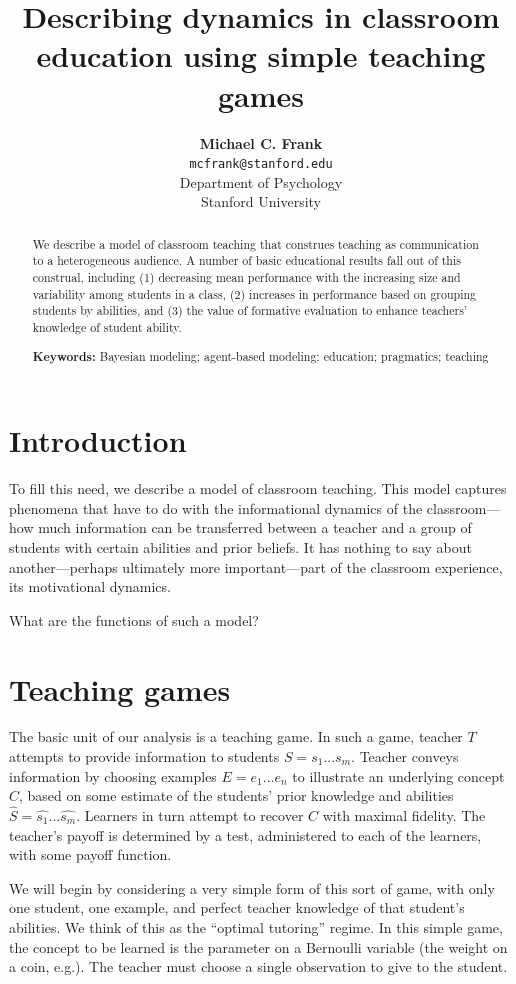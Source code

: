 \documentclass[10pt,letterpaper]{article}
\title{Describing dynamics in classroom education using simple teaching games}
\author{{\large \bf Michael C. Frank} \\
  \texttt{mcfrank@stanford.edu} \\
  Department of Psychology\\
  Stanford University}
\begin{document}
\maketitle


\begin{abstract}
We describe a model of classroom teaching that construes teaching as communication to a heterogeneous audience. A number of basic educational results fall out of this construal, including (1) decreasing mean performance with the increasing size and variability among students in a class, (2) increases in performance based on grouping students by abilities, and (3) the value of formative evaluation to enhance teachers' knowledge of student ability.

\textbf{Keywords:} 
Bayesian modeling; agent-based modeling; education; pragmatics; teaching
\end{abstract}

\section{Introduction}

To fill this need, we describe a model of classroom teaching. This model captures phenomena that have to do with the informational dynamics of the classroom---how much information can be transferred between a teacher and a group of students with certain abilities and prior beliefs. It has nothing to say about another---perhaps ultimately more important---part of the classroom experience, its motivational dynamics.  

What are the functions of such a model? 

\section{Teaching games}

The basic unit of our analysis is a teaching game. In such a game, teacher $T$ attempts to provide information to students $S = {s_1 ... s_m}$. Teacher conveys information by choosing examples $E = {e_1 ... e_n}$ to illustrate an underlying concept $C$, based on some estimate of the students' prior knowledge and abilities $\hat{S} = {\hat{s_1} ... \hat{s_m}}$. Learners in turn attempt to recover $C$ with maximal fidelity. The teacher's payoff is determined by a test, administered to each of the learners, with some payoff function. 

We will begin by considering a very simple form of this sort of game, with only one student, one example, and perfect teacher knowledge of that student's abilities. We think of this as the ``optimal tutoring'' regime. In this simple game, the concept to be learned is the parameter on a Bernoulli variable (the weight on a coin, e.g.). The teacher must choose a single observation to give to the student. 
\end{document}
